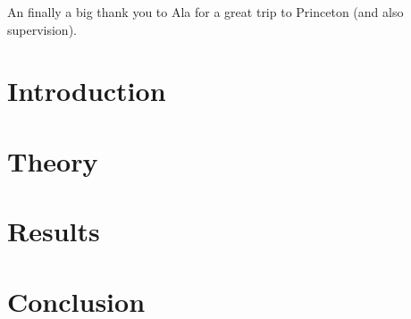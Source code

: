 \documentclass[12pt, oneside]{book}
\newcommand{\nocontentsline}[3]{}
\let\origcontentsline\addcontentsline
\newcommand\stoptoc{\let\addcontentsline\nocontentsline}
\newcommand\resumetoc{\let\addcontentsline\origcontentsline}
\renewcommand{\headrulewidth}{0pt}
\newcommand\mymainpagestyle{%
\fancyhf{}      
\fancyhead[L]{\nouppercase{\footnotesize{\chaptername~ \thechapter~ |~ \leftmark}} \renewcommand{\headrulewidth}{0.4pt} \headrule \renewcommand{\headrulewidth}{0pt}}
\setlength{\headheight}{25pt}
\fancyfoot[C]{\thepage}
}
\begin{document}
An finally a big thank you to Ala for a great trip to Princeton (and also supervision).

\newpage
\tableofcontents
\newpage


\mainmatter 
\mymainpagestyle{} %

\chapter{Introduction}
\label{chap:intro}



\chapter{Theory}
\label{chap:theo}



\chapter{Results}
\label{chap:res}



\chapter{Conclusion}
\label{chap:con}


% 








\appendix
\renewcommand{\thesection}{A\arabic{section}}

\stoptoc



\resumetoc
\end{document}
